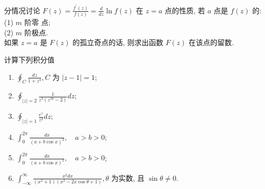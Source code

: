 \documentclass[10pt]{article}
\newenvironment{problem}[2][]{\begin{trivlist}
\item[\hskip \labelsep {\bfseries #1}\hskip \labelsep {\bfseries #2}]}{\end{trivlist}}
\begin{document}
  
\begin{problem}{4.5}
分情况讨论 $F(z)=\frac{f^{\prime}(z)}{f(z)}=\frac{d}{d z} \ln f(z)$ 在 $z=a$ 点的性质, 
  若 $a$ 点是 $f(z)$ 的: 
  \\
  (1) $m$ 阶零 点; 
  \\
  (2) $m$ 阶极点.
  \\
  如果 $z=a$ 是 $F(z)$ 的孤立奇点的话, 则求出函数 $F(z)$ 在该点的留数.
\end{problem}


\begin{problem}{4.6}
  计算下列积分值
  \begin{enumerate}
    \item $\oint_C \frac{d z}{1+z^4}, C$ 为 $|z-1|=1$;
    \item $\oint_{|z|=2} \frac{1}{z^3\left(z^{10}-2\right)} d z$;
    \item $\oint_{|z|=1} \frac{e^z}{z^3} d z$; 
    \item $\int_0^{2 \pi} \frac{d x}{(a+b \cos x)^2}, \quad a>b>0$;
    \item $\int_0^{2 \pi} \frac{d x}{(a+b \cos x)^2}, \quad a>b>0$;
    \item $\int_{-\infty}^{\infty} \frac{x^2 d x}{\left(x^2+1\right)\left(x^2-2 x \cos \theta+1\right)}, \theta$ 为实数, 且 $\sin \theta \neq 0$.
  \end{enumerate}

\end{problem}
  
\end{document}
